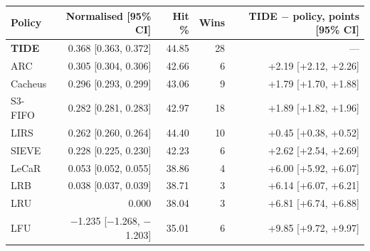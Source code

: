 \begin{tabular}{lrrrr}
\toprule
Policy & Normalised [95\% CI] & Hit \% & Wins & TIDE $-$ policy, points [95\% CI] \\
\midrule
\textbf{TIDE} & 0.368 [0.363, 0.372] & 44.85 & 28 & --- \\
ARC & 0.305 [0.304, 0.306] & 42.66 & 6 & +2.19 [+2.12, +2.26] \\
Cacheus & 0.296 [0.293, 0.299] & 43.06 & 9 & +1.79 [+1.70, +1.88] \\
S3-FIFO & 0.282 [0.281, 0.283] & 42.97 & 18 & +1.89 [+1.82, +1.96] \\
LIRS & 0.262 [0.260, 0.264] & 44.40 & 10 & +0.45 [+0.38, +0.52] \\
SIEVE & 0.228 [0.225, 0.230] & 42.23 & 6 & +2.62 [+2.54, +2.69] \\
LeCaR & 0.053 [0.052, 0.055] & 38.86 & 4 & +6.00 [+5.92, +6.07] \\
LRB & 0.038 [0.037, 0.039] & 38.71 & 3 & +6.14 [+6.07, +6.21] \\
LRU & 0.000 & 38.04 & 3 & +6.81 [+6.74, +6.88] \\
LFU & $-$1.235 [$-$1.268, $-$1.203] & 35.01 & 6 & +9.85 [+9.72, +9.97] \\
\bottomrule
\end{tabular}
